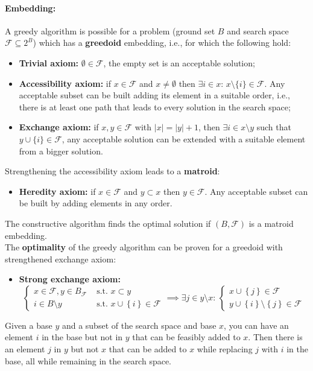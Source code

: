 \documentclass{article}
\begin{document}
	\paragraph{Embedding:} A greedy algorithm is possible for a problem (ground set $B$ and search space $\mathcal{F} \subseteq 2^B$) which has a \textbf{greedoid} embedding, i.e., for which the following hold: 
	\begin{itemize}
		\item \textbf{Trivial axiom:} $\emptyset \in \mathcal{F}$, the empty set is an acceptable solution;
		\item \textbf{Accessibility axiom:} if $x \in \mathcal{F}$ and $x \neq \emptyset$ then $\exists i \in x : \, x \setminus \{i\} \in \mathcal{F}$. Any acceptable subset can be built adding its element in a suitable order, i.e., there is at least one path that leads to every solution in the search space;
		\item \textbf{Exchange axiom:}  if $x, y \in \mathcal{F}$ with $|x| = |y| + 1$, then $\exists i \in x \setminus y$ such that $y \cup \{i\} \in \mathcal{F}$, any acceptable solution can be extended with a suitable element from a bigger solution.
	\end{itemize}
	Strengthening the accessibility axiom leads to a \textbf{matroid}: 
	\begin{itemize}
		\item \textbf{Heredity axiom:} if $x \in \mathcal{F}$ and $y \subset x$ then $y \in \mathcal{F}$. Any acceptable subset can be built by adding elements in any order.\\
	\end{itemize}
	The constructive algorithm finds the optimal solution if $(B, \mathcal{F})$ is a matroid embedding.\\
	
	The \textbf{optimality} of the greedy algorithm can be proven for a greedoid with strengthened exchange axiom: 
	\begin{itemize}
		\item \textbf{Strong exchange axiom:}
		$$ 
		\begin{cases}
			x \in \mathcal{F}, y \in B_{\mathcal{F}} & \text{ s.t. } x \subset y \\
			i \in B \setminus y & \text{ s.t. } x \cup \left\{i\right\} \in \mathcal{F}
		\end{cases}
		\implies \exists j \in y \setminus x: \, 
		\begin{cases}
			x \cup \left\{j\right\} \in \mathcal{F} \\
			y \cup \left\{i\right\} \setminus \left\{j\right\} \in \mathcal{F}
		\end{cases}
		$$
	\end{itemize}
	Given a base $y$ and a subset of the search space and base $x$, you can have an element $i$ in the base but not in $y$ that can be feasibly added to $x$. Then there is an element $j$ in $y$ but not $x$ that can be added to $x$ while replacing $j$ with $i$ in the base, all while remaining in the search space.\\
	
\end{document}
